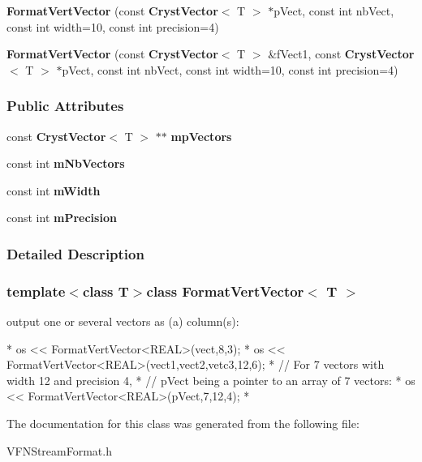 \begin{DoxyCompactItemize}
\item 
{\bfseries Format\-Vert\-Vector} (const {\bf Cryst\-Vector}$<$ T $>$ $\ast$p\-Vect, const int nb\-Vect, const int width=10, const int precision=4)\label{a00039_affdcb56b538bee3033cf89177e2eaa4e}

\item 
{\bfseries Format\-Vert\-Vector} (const {\bf Cryst\-Vector}$<$ T $>$ \&f\-Vect1, const {\bf Cryst\-Vector}$<$ T $>$ $\ast$p\-Vect, const int nb\-Vect, const int width=10, const int precision=4)\label{a00039_a6ca2c9a79903a6d4ba997d413ed8a238}

\end{DoxyCompactItemize}
\subsubsection*{Public Attributes}
\begin{DoxyCompactItemize}
\item 
const {\bf Cryst\-Vector}$<$ T $>$ $\ast$$\ast$ {\bfseries mp\-Vectors}\label{a00039_a373ff434e999897fb583bd4534f18167}

\item 
const int {\bfseries m\-Nb\-Vectors}\label{a00039_a4f7519552502a0968432d19fd2b0df4b}

\item 
const int {\bfseries m\-Width}\label{a00039_a0ea4d4aae7292f4e5421558156f4ba9e}

\item 
const int {\bfseries m\-Precision}\label{a00039_ad64d9a4b653d32862fa7abcc08972249}

\end{DoxyCompactItemize}


\subsubsection{Detailed Description}
\subsubsection*{template$<$class T$>$class Format\-Vert\-Vector$<$ T $>$}

output one or several vectors as (a) column(s)\-: 


\begin{DoxyCode}
*  os << FormatVertVector<REAL>(vect,8,3);
*  os << FormatVertVector<REAL>(vect1,vect2,vetc3,12,6);
*  \textcolor{comment}{// For 7 vectors with width 12 and precision 4,}
*  \textcolor{comment}{// pVect being a pointer to an array of 7 vectors:}
*  os << FormatVertVector<REAL>(pVect,7,12,4);
* 
\end{DoxyCode}
 

The documentation for this class was generated from the following file\-:\begin{DoxyCompactItemize}
\item 
V\-F\-N\-Stream\-Format.\-h\end{DoxyCompactItemize}
